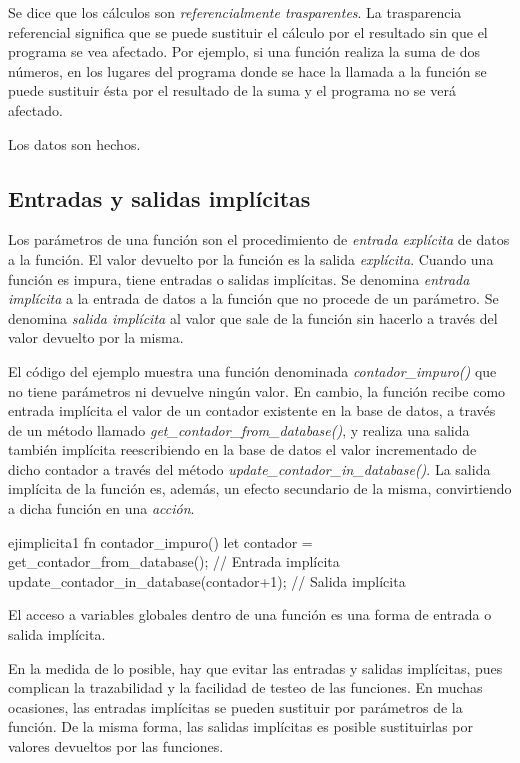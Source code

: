 Se dice que los cálculos son \textit{referencialmente trasparentes}. La trasparencia referencial significa que se puede sustituir el cálculo por el resultado sin que el programa se vea afectado. Por ejemplo, si una función realiza la suma de dos números, en los lugares del programa donde se hace la llamada a la función se puede sustituir ésta por el resultado de la suma y el programa no se verá afectado.

Los datos son hechos.

\subsection{Entradas y salidas implícitas}
\noindent Los parámetros de una función son el procedimiento de \textit{entrada explícita} de datos a la función. El valor devuelto por la función es la salida \textit{explícita}. 
Cuando una función es impura, tiene entradas o salidas implícitas. Se denomina \textit{entrada implícita} a la entrada de datos a la función que no procede de un parámetro. Se denomina \textit{salida implícita} al valor que sale de la función sin hacerlo a través del valor devuelto por la misma.

El código del ejemplo muestra una función denominada \textit{contador\_impuro()} que no tiene parámetros ni devuelve ningún valor. En cambio, la función recibe como entrada implícita el valor de un contador existente en la base de datos, a través de un método llamado \textit{get\_contador\_from\_database()}, y realiza una salida también implícita reescribiendo en la base de datos el valor incrementado de dicho contador a través del método \textit{update\_contador\_in\_database()}. La salida implícita de la función es, además, un efecto secundario de la misma, convirtiendo a dicha función en una \textit{acción}.

\begin{EjemploCodigo}{ejimplicita1}
   fn contador_impuro() {
      let contador = get_contador_from_database(); // Entrada implícita
      update_contador_in_database(contador+1); // Salida implícita
   }
\end{EjemploCodigo}

El acceso a variables globales dentro de una función es una forma de entrada o salida implícita.

En la medida de lo posible, hay que evitar las entradas y salidas implícitas, pues complican la trazabilidad y la facilidad de testeo de las funciones. En muchas ocasiones, las entradas implícitas se pueden sustituir por parámetros de la función. De la misma forma, las salidas implícitas es posible sustituirlas por valores devueltos por las funciones.


